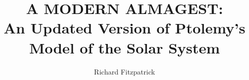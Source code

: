 \documentclass{book}[12pt]
\begin{document}
\title{A MODERN ALMAGEST:\\[0.5ex]An Updated  Version of Ptolemy's Model of the Solar System}
\author{Richard Fitzpatrick}
\date{}
\maketitle

\frontmatter
\tableofcontents


\mainmatter











\fancyhf{} 
\fancyhead[LE,RO]{\thepage}
\pagestyle{fancy}



\end{document}

